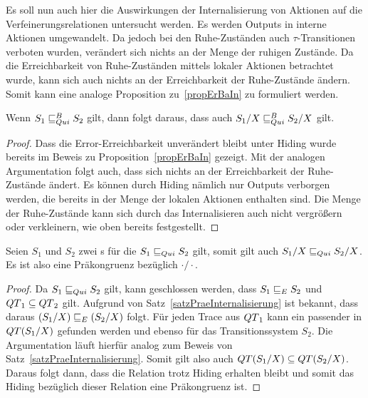 Es soll nun auch hier die Auswirkungen der Internalisierung von Aktionen auf
die Verfeinerungsrelationen untersucht werden. Es werden Outputs in interne
Aktionen umgewandelt. Da jedoch bei den Ruhe-Zuständen auch
$\tau$-Transitionen verboten wurden, verändert sich nichts an der Menge der
ruhigen Zustände. Da die Erreichbarkeit von Ruhe-Zuständen mittels lokaler
Aktionen betrachtet wurde, kann sich auch nichts an der Erreichbarkeit der
Ruhe-Zustände ändern. Somit kann eine analoge Proposition zu~\ref{propErBaIn}
zu formuliert werden.

\begin{prop}
  Wenn $S_1\sqsubseteq _{Qui}^B S_2$ gilt, dann folgt daraus, dass auch $S_1/X\sqsubseteq _{Qui}^B S_2/X$
  gilt.
\end{prop}

\begin{proof}
  Dass die Error-Erreichbarkeit unverändert bleibt unter Hiding wurde bereits
  im Beweis zu Proposition~\ref{propErBaIn} gezeigt. Mit der analogen
  Argumentation folgt auch, dass sich nichts an der Erreichbarkeit der
  Ruhe-Zustände ändert. Es können durch Hiding nämlich nur Outputs verborgen
  werden, die bereits in der Menge der lokalen Aktionen enthalten sind. Die
  Menge der Ruhe-Zustände kann sich durch das Internalisieren auch nicht
  vergrößern oder verkleinern, wie oben bereits festgestellt.
\end{proof}

\begin{satz}
  \label{satzPraeInterQui}
  Seien $S_1$ und $S_2$ zwei \EIO{}s für die $S_1\sqsubseteq _{Qui} S_2$ gilt, somit gilt
  auch $S_1/X\sqsubseteq _{Qui} S_2/X$. Es ist also \QRel{} eine Präkongruenz bezüglich
  $\cdot /\cdot$.
\end{satz}

\begin{proof}
  Da $S_1\sqsubseteq _{Qui} S_2$ gilt, kann geschlossen werden, dass $S_1\sqsubseteq _E S_2$ und $QT{}_1\subseteq
  QT{}_2$ gilt. Aufgrund von
  Satz~\ref{satzPraeInternalisierung} ist bekannt, dass daraus $(S_1/X)\sqsubseteq _E
  (S_2/X)$ folgt. Für jeden Trace aus $QT{}_1$ kann ein passender
  in $QT{}(S_1/X)$ gefunden werden und ebenso für das Transitionssystem $S_2$. Die
  Argumentation läuft hierfür analog zum Beweis von
  Satz~\ref{satzPraeInternalisierung}. Somit gilt
  also auch $QT{}(S_1/X)\subseteq QT{}(S_2/X)$. Daraus folgt dann, dass die
  Relation \QRel{} trotz Hiding erhalten bleibt und somit das Hiding bezüglich
  dieser Relation eine Präkongruenz ist.
\end{proof}

